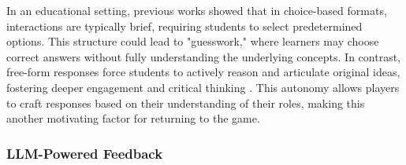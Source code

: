 In an educational setting, previous works showed that in choice-based formats, interactions are typically brief, requiring students to select predetermined options. This structure could lead to "guesswork," where learners may choose correct answers without fully understanding the underlying concepts. In contrast, free-form responses force students to actively reason and articulate original ideas, fostering deeper engagement and critical thinking \cite{bryfczynski2012besocratic}. This autonomy allows players to craft responses based on their understanding of their roles, making this another motivating factor for returning to the game\cite{ravyse2017success}.
 


\subsubsection{LLM-Powered Feedback}

